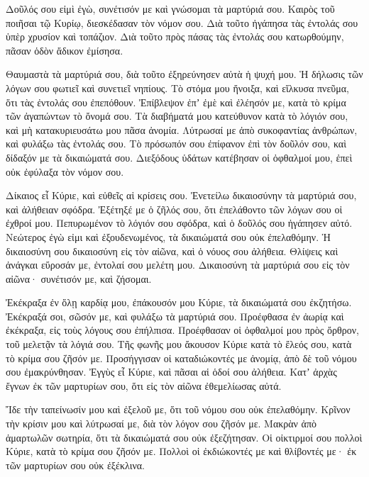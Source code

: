 {Δοῦλός σου εἰμὶ ἐγὼ, συνέτισόν με καὶ γνώσομαι τὰ μαρτύριά σου.
Καιρὸς τοῦ ποιῆσαι τῷ Κυρίῳ, διεσκέδασαν τὸν νόμον σου.
Διὰ τοῦτο ἠγάπησα τὰς ἐντολάς σου ὑπὲρ χρυσίον καὶ τοπάζιον.
Διὰ τοῦτο πρὸς πάσας τὰς ἐντολάς σου κατωρθούμην, πᾶσαν ὁδὸν ἄδικον ἐμίσησα.
\par }{\PP {}Θαυμαστὰ τὰ μαρτύριά σου, διὰ τοῦτο ἐξηρεύνησεν αὐτὰ ἡ ψυχή μου.
Ἡ δήλωσις τῶν λόγων σου φωτιεῖ καὶ συνετιεῖ νηπίους.
Τὸ στόμα μου ἤνοιξα, καὶ εἵλκυσα πνεῦμα, ὅτι τὰς ἐντολάς σου ἐπεπόθουν.
Ἐπίβλεψον ἐπʼ ἐμὲ καὶ ἐλέησόν με, κατὰ τὸ κρίμα τῶν ἀγαπώντων τὸ ὄνομά σου.
Τὰ διαβήματά μου κατεύθυνον κατὰ τὸ λόγιόν σου, καὶ μὴ κατακυριευσάτω μου πᾶσα ἀνομία.
Λύτρωσαί με ἀπὸ συκοφαντίας ἀνθρώπων, καὶ φυλάξω τὰς ἐντολάς σου.
Τὸ πρόσωπόν σου ἐπίφανον ἐπὶ τὸν δοῦλόν σου, καὶ δίδαξόν με τὰ δικαιώματά σου.
Διεξόδους ὑδάτων κατέβησαν οἱ ὀφθαλμοί μου, ἐπεὶ οὐκ ἐφύλαξα τὸν νόμον σου.
\par }{\PP {}Δίκαιος εἶ Κύριε, καὶ εὐθεῖς αἱ κρίσεις σου.
Ἐνετείλω δικαιοσύνην τὰ μαρτύριά σου, καὶ ἀλήθειαν σφόδρα.
Ἐξέτηξέ με ὁ ζῆλός σου, ὅτι ἐπελάθοντο τῶν λόγων σου οἱ ἐχθροί μου.
Πεπυρωμένον τὸ λόγιόν σου σφόδρα, καὶ ὁ δοῦλός σου ἠγάπησεν αὐτό.
Νεώτερος ἐγὼ εἰμι καὶ ἐξουδενωμένος, τὰ δικαιώματά σου οὐκ ἐπελαθόμην.
Ἡ δικαιοσύνη σου δικαιοσύνη εἰς τὸν αἰῶνα, καὶ ὁ νόυος σου ἀλήθεια.
Θλίψεις καὶ ἀνάγκαι εὕροσάν με, ἐντολαί σου μελέτη μου.
Δικαιοσύνη τὰ μαρτύριά σου εἰς τὸν αἰῶνα· συνέτισόν με, καὶ ζήσομαι.
\par }{\PP {}Ἐκέκραξα ἐν ὅλῃ καρδίᾳ μου, ἐπάκουσόν μου Κύριε, τὰ δικαιώματά σου ἐκζητήσω.
Ἐκέκραξά σοι, σῶσόν με, καὶ φυλάξω τὰ μαρτύριά σου.
Προέφθασα ἐν ἀωρίᾳ καὶ ἐκέκραξα, εἰς τοὺς λόγους σου ἐπήλπισα.
Προέφθασαν οἱ ὀφθαλμοί μου πρὸς ὄρθρον, τοῦ μελετᾷν τὰ λόγιά σου.
Τῆς φωνῆς μου ἄκουσον Κύριε κατὰ τὸ ἔλεός σου, κατὰ τὸ κρίμα σου ζῆσόν με.
Προσήγγισαν οἱ καταδιώκοντές με ἀνομίᾳ, ἀπὸ δὲ τοῦ νόμου σου ἐμακρύνθησαν.
Ἐγγὺς εἶ Κύριε, καὶ πᾶσαι αἱ ὁδοί σου ἀλήθεια.
Κατʼ ἀρχὰς ἔγνων ἐκ τῶν μαρτυρίων σου, ὅτι εἰς τὸν αἰῶνα ἐθεμελίωσας αὐτά.
\par }{\PP {}Ἴδε τὴν ταπείνωσίν μου καὶ ἐξελοῦ με, ὅτι τοῦ νόμου σου οὐκ ἐπελαθόμην.
Κρῖνον τὴν κρίσιν μου καὶ λύτρωσαί με, διὰ τὸν λόγον σου ζῆσόν με.
Μακρὰν ἀπὸ ἁμαρτωλῶν σωτηρία, ὅτι τὰ δικαιώματά σου οὐκ ἐξεζήτησαν.
Οἱ οἰκτιρμοί σου πολλοὶ Κύριε, κατὰ τὸ κρίμα σου ζῆσόν με.
Πολλοὶ οἱ ἐκδιώκοντές με καὶ θλίβοντές με· ἐκ τῶν μαρτυρίων σου οὐκ ἐξέκλινα.
}
